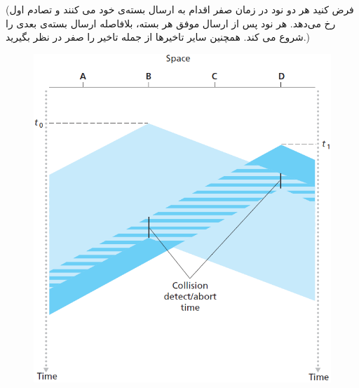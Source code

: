 \documentclass[10pt,letterpaper]{article}
\begin{document}
(فرض کنید هر دو نود در زمان صفر اقدام به ارسال بسته‌ی خود می کنند و تصادم اول رخ می‌دهد. هر نود پس از ارسال موفق هر بسته، بلافاصله ارسال بسته‌ی بعدی را شروع می کند. همچنین سایر تاخیرها از جمله تاخیر 
را صفر در نظر بگیرید.)
\begin{figure}[htb]
\centering
\includegraphics[width=130mm]{csma_cd.png}
\end{figure}
\end{document}
